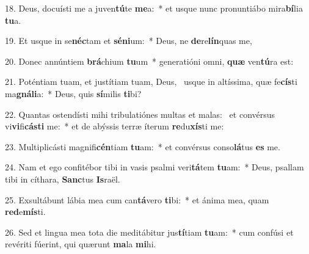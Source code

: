 18. Deus, docuísti me a juven\textbf{tú}te \textbf{me}a:~*  et usque nunc pronuntiábo mira\textbf{bí}lia \textbf{tu}a.\

19. Et usque in se\textbf{néc}tam et \textbf{sé}\textbf{ni}um:~*  Deus, ne \textbf{de}re\textbf{lín}quas me,\

20. Donec annúntiem \textbf{brá}chium \textbf{tu}um~*  generatióni omni, \textbf{quæ} ven\textbf{tú}ra est:\

21. Poténtiam tuam, et justítiam tuam, Deus, \dag\  usque in altíssima, quæ fe\textbf{cís}ti ma\textbf{gná}\textbf{li}a:~*  Deus, quis \textbf{sí}milis \textbf{ti}bi?\

22. Quantas ostendísti mihi tribulatiónes multas et malas: \dag\  et convérsus vi\textbf{vi}fi\textbf{cás}\textbf{ti} me:~*  et de abýssis terræ íterum \textbf{re}du\textbf{xís}ti me:\

23. Multiplicásti magnifi\textbf{cén}tiam \textbf{tu}am:~*  et convérsus conso\textbf{lá}tus \textbf{es} me.\

24. Nam et ego confitébor tibi in vasis psalmi veri\textbf{tá}tem \textbf{tu}am:~*  Deus, psallam tibi in cíthara, \textbf{Sanc}tus \textbf{Is}raël.\

25. Exsultábunt lábia mea cum can\textbf{tá}vero \textbf{ti}bi:~*  et ánima mea, quam \textbf{red}e\textbf{mís}ti.\

26. Sed et lingua mea tota die meditábitur jus\textbf{tí}tiam \textbf{tu}am:~*  cum confúsi et revériti fúerint, qui quærunt \textbf{ma}la \textbf{mi}hi.\

